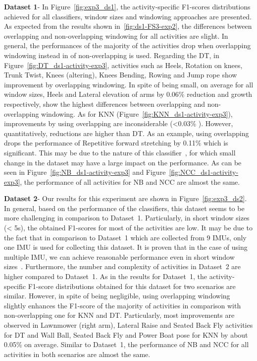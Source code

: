\documentclass[sensors,article,submit,moreauthors,pdftex]{Definitions/mdpi}
\begin{document}
\noindent\textbf{Dataset 1}- In Figure~\ref{fig:exp3_ds1}, the activity-specific F1-scores distributions achieved for all classifiers, window sizes and windowing approaches are presented. As expected from the results shown in~\ref{fig:ds1-FS3-exp2}, the differences between overlapping and non-overlapping windowing for all activities are slight. In general, the performances of the majority of the activities drop when overlapping windowing instead in of non-overlapping is used. Regarding the DT, in Figure~\ref{fig:DT_ds1-activity-exp3}, activities such as Heels, Rotation on knees, Trunk Twist, Knees (altering), Knees Bending, Rowing and Jump rope show improvement by overlapping windowing. In spite of being small, on average for all window sizes, Heels and Lateral elevation of arms by 0.06\% reduction and growth respectively, show the highest differences between overlapping and non-overlapping windowing. As for KNN (Figure~\ref{fig:KNN_ds1-activity-exp3}), improvements by using overlapping are inconsiderable (<0.03\% ). However, quantitatively,  reductions are higher than DT. As an example, using overlapping drops the performance of  Repetitive forward stretching by 0.11\% which is significant. This may be due to the nature of this classifier~\cite{cover1967nearest}, for which small change in the dataset may have a large impact on the performance. As can be seen in Figure~\ref{fig:NB_ds1-activity-exp3} and Figure~\ref{fig:NCC_ds1-activity-exp3}, the performance of all activities for NB and NCC are almost the same.    

\noindent\textbf{Dataset 2}- Our results for this experiment are shown in Figure~\ref{fig:exp3_ds2}. In general, based on the performance of the classifiers, this dataset seems to be more challenging in comparison to Dataset~1. Particularly, in short window sizes (< 5s), the obtained F1-scores for most of the activities are low. It may be due to the fact that in comparison to Dataset~1 which are collected from 9 IMUs, only one IMU is used for collecting this dataset. It is proven that in the case of using multiple IMU, we can achieve reasonable performance even in short window sizes~\cite{banos2014window}. Furthermore, the number and complexity of activities in Dataset~2 are higher compared to Dataset~1. As in the results for Dataset~1, the activity-specific F1-score distributions obtained for this dataset for two scenarios are similar. However, in spite of being negligible, using overlapping windowing slightly enhances the F1-score of the majority of activities in comparison with non-overlapping one for KNN and DT. Particularly, most improvements are observed in Lawnmower (right arm), Lateral Raise and Seated Back Fly activities for DT and Wall Ball, Seated Back Fly and Power Boat pose for KNN by about 0.05\% on average. Similar to Dataset~1, the performance of NB and NCC for all activities in both scenarios are almost the same. 
\end{document}
